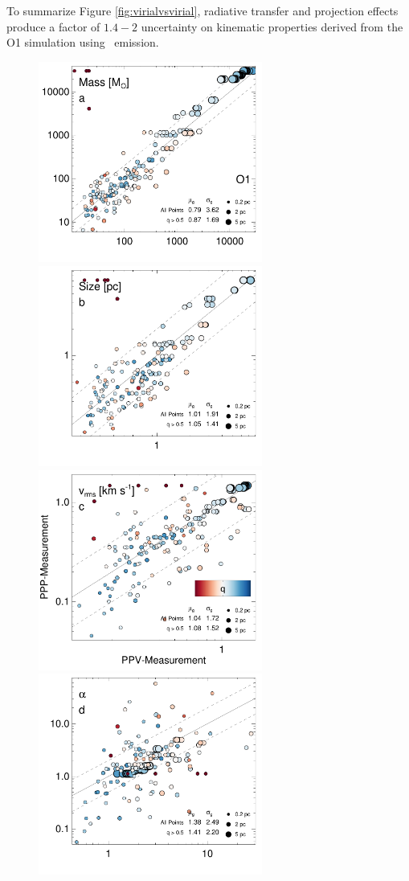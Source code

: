 To summarize Figure \ref{fig:virialvsvirial}, radiative transfer and projection effects produce a factor of $1.4-2$ uncertainty on kinematic properties derived from the O1 simulation using \coc\, emission.

\begin{figure}[htbp]
\includegraphics[width=2.9in]{figures/mass_stella_13co}\hfill
\includegraphics[width=2.9in]{figures/size_stella_13co}
\includegraphics[width=2.9in]{figures/vel_stella_13co}\hfill
\includegraphics[width=2.9in]{figures/virial_stella_13co}

\end{figure}
